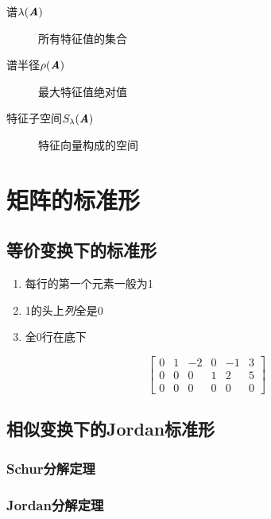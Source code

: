 \begin{definition}
    \begin{description}
        \item[谱$\lambda(\boldsymbol{\mathit{A}})$] 所有特征值的集合
        \item[谱半径$\rho(\boldsymbol{\mathit{A}})$] 最大特征值绝对值
        \item[特征子空间$S_{\lambda}(\boldsymbol{\mathit{A}})$] 特征向量构成的空间
    \end{description}
\end{definition}

\section{矩阵的标准形}
\label{sec:矩阵的标准形}

\subsection{等价变换下的标准形}
\label{sub:等价变换下的标准形}

\begin{definition}[行阶梯矩阵]
    \begin{enumerate}
        \item 每行的第一个元素一般为1
        \item 1的头上\emph{列}全是0
        \item 全0行在底下
    \end{enumerate}

    \[
        \begin{bmatrix}
            0   &   1   &   -2  &   0   &   -1  &   3   \\
            0   &   0   &   0   &   1   &   2   &   5   \\
            0   &   0   &   0   &   0   &   0   &   0
        \end{bmatrix}
    \]
\end{definition}

\subsection{相似变换下的Jordan标准形}
\label{sub:相似变换下的Jordan标准形}

\subsubsection{Schur分解定理}
\label{ssub:schurfen_jie_ding_li_}

\subsubsection{Jordan分解定理}
\label{ssub:jordanfen_jie_ding_li_}

